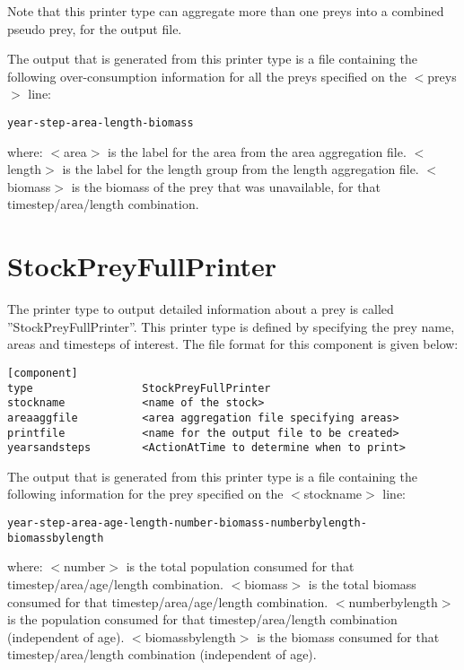 \documentclass [a4paper, 10pt]{book}
\begin{document}
Note that this printer type can aggregate more than one preys into a combined pseudo prey, for the output file.

\bigskip
The output that is generated from this printer type is a file containing the following over-consumption information for all the preys specified on the $<$preys$>$ line:

\begin{verbatim}
year-step-area-length-biomass
\end{verbatim}

where:\newline
$<$area$>$ is the label for the area from the area aggregation file.\newline
$<$length$>$ is the label for the length group from the length aggregation file.\newline
$<$biomass$>$ is the biomass of the prey that was unavailable, for that timestep/area/length combination.

\section{StockPreyFullPrinter}\label{sec:stockpreyfullprinter}
The printer type to output detailed information about a prey is called ''StockPreyFullPrinter''.  This printer type is defined by specifying the prey name, areas and timesteps of interest.  The file format for this component is given below:

\begin{verbatim}
[component]
type                 StockPreyFullPrinter
stockname            <name of the stock>
areaaggfile          <area aggregation file specifying areas>
printfile            <name for the output file to be created>
yearsandsteps        <ActionAtTime to determine when to print>
\end{verbatim}

The output that is generated from this printer type is a file containing the following information for the prey specified on the $<$stockname$>$ line:

\begin{verbatim}
year-step-area-age-length-number-biomass-numberbylength-biomassbylength
\end{verbatim}

where:\newline
$<$number$>$ is the total population consumed for that timestep/area/age/length combination.\newline
$<$biomass$>$ is the total biomass consumed for that timestep/area/age/length combination.\newline
$<$numberbylength$>$ is the population consumed for that timestep/area/length combination (independent of age).\newline
$<$biomassbylength$>$ is the biomass consumed for that timestep/area/length combination (independent of age).
\end{document}
